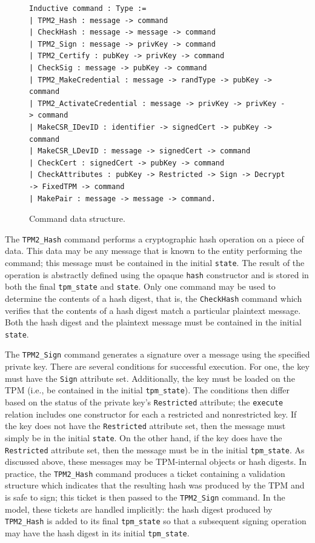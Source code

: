 \documentclass[runningheads]{llncs}
\begin{document}
\begin{figure}[h]
  \begin{footnotesize}
\begin{lstlisting}[language=Coq]
Inductive command : Type :=
| TPM2_Hash : message -> command
| CheckHash : message -> message -> command
| TPM2_Sign : message -> privKey -> command
| TPM2_Certify : pubKey -> privKey -> command
| CheckSig : message -> pubKey -> command
| TPM2_MakeCredential : message -> randType -> pubKey -> command
| TPM2_ActivateCredential : message -> privKey -> privKey -> command
| MakeCSR_IDevID : identifier -> signedCert -> pubKey -> command
| MakeCSR_LDevID : message -> signedCert -> command
| CheckCert : signedCert -> pubKey -> command
| CheckAttributes : pubKey -> Restricted -> Sign -> Decrypt -> FixedTPM -> command
| MakePair : message -> message -> command.
\end{lstlisting}
\end{footnotesize}
\caption{Command data structure.}
\end{figure}

The \verb|TPM2_Hash| command performs a cryptographic hash operation
on a piece of data. This data may be any message that is known to the
entity performing the command; this message must be contained in the
initial \verb|state|. The result of the operation is abstractly
defined using the opaque \verb|hash| constructor and is stored in both
the final \verb|tpm_state| and \verb|state|. Only one command may be
used to determine the contents of a hash digest, that is, the
\verb|CheckHash| command which verifies that the contents of a hash
digest match a particular plaintext message. Both the hash digest and
the plaintext message must be contained in the initial \verb|state|. 

The \verb|TPM2_Sign| command generates a signature over a message using the specified private key. There are several conditions for successful execution. For one, the key must have the \verb|Sign| attribute set. Additionally, the key must be loaded on the TPM (i.e., be contained in the initial \verb|tpm_state|). The conditions then differ based on the status of the private key's \verb|Restricted| attribute; the \verb|execute| relation includes one constructor for each a restricted and nonrestricted key. If the key does not have the \verb|Restricted| attribute set, then the message must simply be in the initial \verb|state|. On the other hand, if the key does have the \verb|Restricted| attribute set, then the message must be in the initial \verb|tpm_state|. As discussed above, these messages may be TPM-internal objects or hash digests. In practice, the \verb|TPM2_Hash| command produces a ticket containing a validation structure which indicates that the resulting hash was produced by the TPM and is safe to sign; this ticket is then passed to the \verb|TPM2_Sign| command. In the model, these tickets are handled implicitly: the hash digest produced by \verb|TPM2_Hash| is added to its final \verb|tpm_state| so that a subsequent signing operation may have the hash digest in its initial \verb|tpm_state|. 
\end{document}
